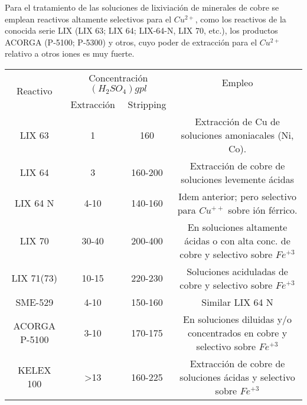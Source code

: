 Para el tratamiento de las soluciones de lixiviaci\'on de minerales de cobre se emplean reactivos altamente selectivos para el $Cu^{2+}$, como los reactivos de la conocida serie LIX (LIX 63; LIX 64; LIX-64-N, LIX 70, etc.), los productos ACORGA (P-5100; P-5300) y otros, cuyo poder de extracci\'on para el $Cu^{2+}$ relativo a otros iones es muy fuerte.

\begin{table}[H]
\label{tabla5}
\begin{center}
\begin{tabular}{|c|c|c|c|}
\hline
\multirow{2}{1.7cm}{Reactivo} & \multicolumn{2}{c|}{Concentraci\'on $(H_2SO_4)gpl$}&Empleo\\
\cline{2-3} 
 &Extracci\'on&Stripping& \\
\hline 
\multirow{2}{1.7cm}{LIX 63}&\multirow{2}{*}{1}&\multirow{2}{*}{160}&\multirow{2}{5.5cm}{Extracci\'on de Cu de soluciones amoniacales (Ni, Co).}\\
 & & & \\
\hline 
\multirow{2}{1.7cm}{LIX 64}&\multirow{2}{*}{3}&\multirow{2}{*}{160-200}&\multirow{2}{5.5cm}{Extracci\'on de cobre de soluciones levemente \'acidas}\\
 & & & \\
\hline
\multirow{2}{1.7cm}{LIX 64 N}&\multirow{2}{*}{4-10}&\multirow{2}{*}{140-160}&\multirow{2}{5.5cm}{Idem anterior; pero selectivo para $Cu^{++}$ sobre i\'on f\'errico.}\\
 & & & \\
\hline
\multirow{3}{1.7cm}{LIX 70}&\multirow{3}{*}{30-40}&\multirow{3}{*}{200-400}&\multirow{3}{5.5cm}{En soluciones altamente \'acidas o con alta conc. de cobre y selectivo sobre $Fe^{+3}$}\\
 & & & \\
 & & & \\
\hline
\multirow{2}{1.7cm}{LIX 71(73)}&\multirow{2}{*}{10-15}&\multirow{2}{*}{220-230}&\multirow{2}{5.5cm}{Soluciones aciduladas de cobre y selectivo sobre $Fe^{+3}$}\\
 & & & \\
\hline
SME-529&4-10&150-160&Similar LIX 64 N\\
\hline
\multirow{3}{1.7cm}{ACORGA P-5100}&\multirow{3}{*}{3-10}&\multirow{3}{*}{170-175}&\multirow{3}{5.5cm}{En soluciones diluidas y/o concentrados en cobre y selectivo sobre $Fe^{+3}$}\\
 & & & \\
 & & & \\
\hline
\multirow{3}{1.7cm}{KELEX 100}&\multirow{3}{*}{>13}&\multirow{3}{*}{160-225}&\multirow{3}{5.5cm}{Extracci\'on de cobre de soluciones \'acidas y selectivo sobre $Fe^{+3}$}\\

\end{tabular}
\end{center}
\end{table}

